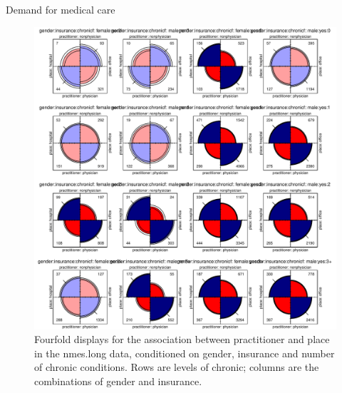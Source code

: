 \documentclass[11pt]{book}\usepackage[]{graphicx}\usepackage[]{color}
\newenvironment{knitrout}{}{} %
\renewenvironment{knitrout}{\small\renewcommand{\baselinestretch}{.85}}{} %
\begin{document}
\begin{Example}[nmes4]{Demand for medical care}
\begin{knitrout}
\begin{figure}[!htbp]
\centerline{\includegraphics[width=\textwidth]{ch09/fig/nmes4-fourfold2} }

\caption[Fourfold displays for the association between practitioner and place in the nmes]{Fourfold displays for the association between practitioner and place in the nmes.long data, conditioned on gender, insurance and number of chronic conditions. Rows are levels of chronic; columns are the combinations of gender and insurance.\label{fig:nmes4-fourfold2}}
\end{figure}



\end{knitrout}
\end{Example}
\end{document}
